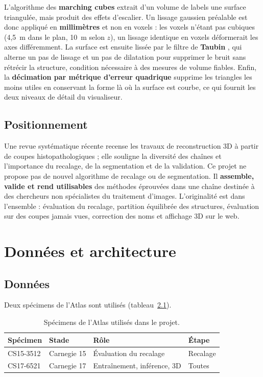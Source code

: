 \documentclass[12pt,a4paper]{report}
\begin{document}
L'algorithme des \textbf{marching cubes} \cite{lorensen1987} extrait d'un volume de labels une surface triangulée, mais produit des effets d'escalier. Un lissage gaussien préalable est donc appliqué en \textbf{millimètres} et non en voxels : les voxels n'étant pas cubiques (4,5~\textmu m dans le plan, 10~\textmu m selon $z$), un lissage identique en voxels déformerait les axes différemment. La surface est ensuite lissée par le filtre de \textbf{Taubin} \cite{taubin1995}, qui alterne un pas de lissage et un pas de dilatation pour supprimer le bruit sans rétrécir la structure, condition nécessaire à des mesures de volume fiables. Enfin, la \textbf{décimation par métrique d'erreur quadrique} \cite{garland1997} supprime les triangles les moins utiles en conservant la forme là où la surface est courbe, ce qui fournit les deux niveaux de détail du visualiseur.

\section{Positionnement}

Une revue systématique récente \cite{kurz2024} recense les travaux de reconstruction 3D à partir de coupes histopathologiques ; elle souligne la diversité des chaînes et l'importance du recalage, de la segmentation et de la validation. Ce projet ne propose pas de nouvel algorithme de recalage ou de segmentation. Il \textbf{assemble, valide et rend utilisables} des méthodes éprouvées dans une chaîne destinée à des chercheurs non spécialistes du traitement d'images. L'originalité est dans l'ensemble : évaluation du recalage, partition équilibrée des structures, évaluation sur des coupes jamais vues, correction des noms et affichage 3D sur le web.

\chapter{Données et architecture}\label{ch:data}

\section{Données}

Deux spécimens de l'Atlas sont utilisés (tableau~\ref{tab:specimens}).

\begin{table}[H]
\centering
\begin{tabular}{llll}
\toprule
\textbf{Spécimen} & \textbf{Stade} & \textbf{Rôle} & \textbf{Étape} \\
\midrule
CS15-3512 & Carnegie 15 & Évaluation du recalage & Recalage \\
CS17-6521 & Carnegie 17 & Entraînement, inférence, 3D & Toutes \\
\bottomrule
\end{tabular}
\caption{Spécimens de l'Atlas utilisés dans le projet.}
\label{tab:specimens}
\end{table}
\end{document}
